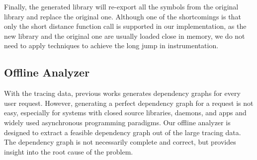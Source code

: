 Finally, the generated library will re-export all the symbols from the original library and replace the original one.
Although one of the shortcomings is that only the short distance function call is supported in our implementation, as the new library and the original one are usually loaded close in memory, we do not need to apply techniques to achieve the long jump in instrumentation.\par
\subsection{Offline Analyzer}
With the tracing data, previous works\cite{magpie, panappticon} generates dependency graphs for every user request.
However, generating a perfect dependency graph for a request is not easy, especially for systems with closed source libraries, daemons, and apps and widely used asynchronous programming paradigms.
Our offline analyzer is designed to extract a feasible dependency graph out of the large tracing data.
The dependency graph is not necessarily complete and correct, but provides insight into the root cause of the problem.\par
